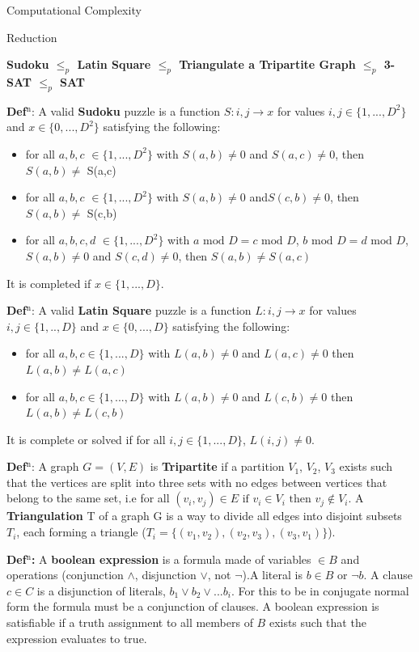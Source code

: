 \documentclass[final]{beamer}
\newlength{\colwidth}
\newcounter{row}
\newcounter{col}
\begin{document}
\begin{frame}[t]
\begin{columns}[t]
\begin{column}{\colwidth}
\begin{block}{Computational Complexity}
  \end{block}
  \begin{block}{Reduction}

   \textbf{Sudoku $\leq_p$ Latin Square $\leq_p$ Triangulate a Tripartite Graph $\leq_p$ 3-SAT $\leq_p$ SAT}

	\textbf{Def$^\text{n}$}: A valid \textbf{Sudoku} puzzle is a function $ S: i,j \rightarrow x$ for values $i,j \in \{1,...,D^2\}$ and $x \in \{0,...,D^2\}$ satisfying the following:
\begin{itemize}
	\item{for all $a,b,c$  $\in \{1,...,D^2\}$ with $S(a,b)\neq 0$ and $S(a,c)\neq 0$, then $ S(a,b)\neq$ S(a,c) }
	\item{for all $a,b,c$  $\in \{1,...,D^2\}$ with $S(a,b)\neq 0$ and$ S(c,b)\neq 0$, then $S(a,b)\neq$ S(c,b) }
	\item{for all $ a,b,c,d $ $\in \{1,...,D^2\}$ with $a\text{ mod }D = c\text{ mod }D$, $b\text{ mod }D  =  d\text{ mod }D$, $S(a,b)\neq 0$  and $S(c,d) \neq 0$, then $S(a,b)\neq S(a,c)$ }
\end{itemize}
It is completed if $x \in \{1,...,D\}$.


\textbf{Def$^\text{n}$}: A valid \textbf{Latin Square} puzzle is a function $L:i,j \rightarrow x$ for values $i,j \in \{1,..,D\} $ and $x \in \{0,...,D\}$ satisfying the following:
\begin{itemize}
\item{for all $a,b,c \in \{1,...,D\}$ with $L(a,b) \neq 0 $ and $L(a,c) \neq 0$ then $L(a,b) \neq L(a,c)$}
\item{for all $a,b,c \in \{1,...,D\}$ with $L(a,b) \neq 0 $ and $L(c,b) \neq 0$ then $L(a,b) \neq L(c,b)$}
\end{itemize}
It is complete or solved if for all $i,j \in \{1,...,D\}$, $L(i,j) \neq 0$.

\textbf{Def$^\text{n}$}: A graph $G=(V,E)$ is \textbf{Tripartite} if a partition $V_1$, $V_2$, $V_3$ exists such that the vertices are split into three sets with no edges between vertices that belong to the same set, i.e for all $(v_i,v_j) \in E\text{ if } v_i \in V_i\text{ then }v_j \not\in V_i $. A \textbf{Triangulation} T of a graph G is a way to divide all edges into disjoint subsets $T_i$, each forming a triangle ($T_i=\{(v_{1}, v_{2}),(v_{2}, v_{3}),(v_{3},v_{1})\}$).

\textbf{Def$^\text{n}$:} A \textbf{boolean expression} is a formula made of variables $\in B$ and operations (conjunction $\land$, disjunction $\lor$, not $\neg$).A literal is $b\in B$ or $\neg b$. A clause $c\in C$ is a disjunction of literals, $b_1 \lor b_2 \lor ... b_i$. For this to be in conjugate normal form the formula must be a conjunction of clauses. A boolean expression is satisfiable if a truth assignment to all members of $B$ exists such that the expression evaluates to true. 


\end{block}
\end{column}
\end{columns}
\end{frame}
\end{document}

